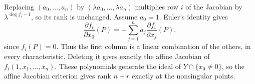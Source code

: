 Replacing $(a_0,\ldots,a_n)$ by $(\lambda a_0,\ldots,\lambda a_n)$ multiplies row $i$ of the Jacobian by $\lambda^{\deg f_i-1}$, so its rank is unchanged. Assume $a_0=1$. Euler's identity gives
\[\frac{\partial f_i}{\partial x_0}(P)=-\sum_{j=1}^n a_j\frac{\partial f_i}{\partial x_j}(P),\]
since $f_i(P)=0$. Thus the first column is a linear combination of the others, in every characteristic. Deleting it gives exactly the affine Jacobian of $f_i(1,x_1,\ldots,x_n)$. These polynomials generate the ideal of $Y\cap\{x_0\ne0\}$, so the affine Jacobian criterion gives rank $n-r$ exactly at the nonsingular points.
